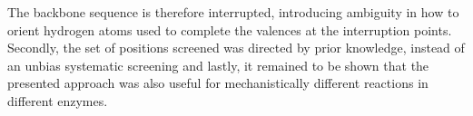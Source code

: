 The backbone sequence is therefore interrupted, introducing ambiguity in how to orient hydrogen atoms used to complete the valences at the interruption points.
Secondly, the set of positions screened was directed by prior knowledge, instead of an unbias systematic screening and lastly, it remained to be shown that the presented approach was also useful for mechanistically different reactions in different enzymes.
%

\clearpage
